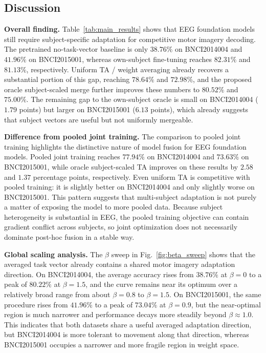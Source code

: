 \documentclass[conference]{IEEEtran}
\begin{document}
\subsection{Discussion}
\textbf{Overall finding.} Table~\ref{tab:main_results} shows that EEG foundation models still require subject-specific adaptation for competitive motor imagery decoding. The pretrained no-task-vector baseline is only $38.76\%$ on BNCI2014004 and $41.96\%$ on BNCI2015001, whereas own-subject fine-tuning reaches $82.31\%$ and $81.13\%$, respectively. Uniform TA / weight averaging already recovers a substantial portion of this gap, reaching $78.64\%$ and $72.98\%$, and the proposed oracle subject-scaled merge further improves these numbers to $80.52\%$ and $75.00\%$. The remaining gap to the own-subject oracle is small on BNCI2014004 ($1.79$ points) but larger on BNCI2015001 ($6.13$ points), which already suggests that subject vectors are useful but not uniformly mergeable.

\textbf{Difference from pooled joint training.} The comparison to pooled joint training highlights the distinctive nature of model fusion for EEG foundation models. Pooled joint training reaches $77.94\%$ on BNCI2014004 and $73.63\%$ on BNCI2015001, while oracle subject-scaled TA improves on these results by $2.58$ and $1.37$ percentage points, respectively. Even uniform TA is competitive with pooled training: it is slightly better on BNCI2014004 and only slightly worse on BNCI2015001. This pattern suggests that multi-subject adaptation is not purely a matter of exposing the model to more pooled data. Because subject heterogeneity is substantial in EEG, the pooled training objective can contain gradient conflict across subjects, so joint optimization does not necessarily dominate post-hoc fusion in a stable way.

\textbf{Global scaling analysis.} The $\beta$ sweep in Fig.~\ref{fig:beta_sweep} shows that the averaged task vector already contains a shared motor imagery adaptation direction. On BNCI2014004, the average accuracy rises from $38.76\%$ at $\beta=0$ to a peak of $80.22\%$ at $\beta=1.5$, and the curve remains near its optimum over a relatively broad range from about $\beta=0.8$ to $\beta=1.5$. On BNCI2015001, the same procedure rises from $41.96\%$ to a peak of $73.04\%$ at $\beta=0.9$, but the near-optimal region is much narrower and performance decays more steadily beyond $\beta\approx 1.0$. This indicates that both datasets share a useful averaged adaptation direction, but BNCI2014004 is more tolerant to movement along that direction, whereas BNCI2015001 occupies a narrower and more fragile region in weight space.
\end{document}
